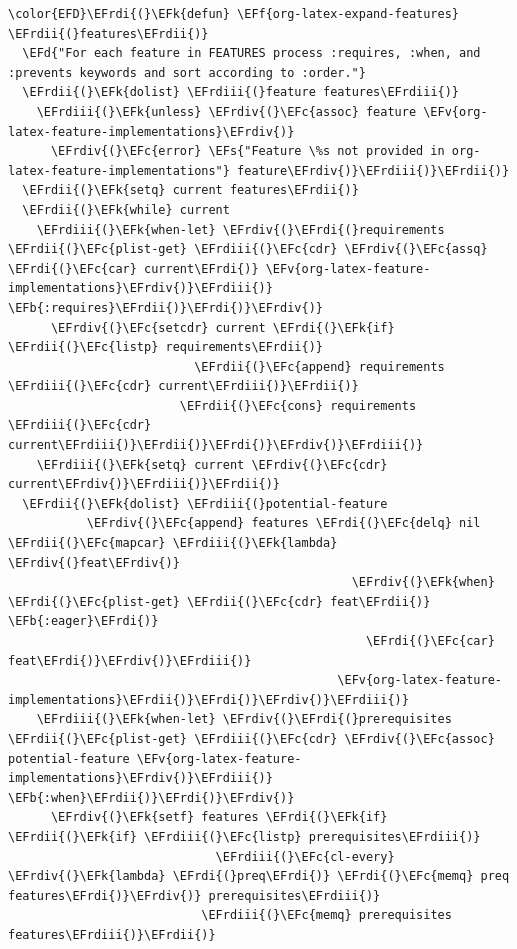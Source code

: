 \documentclass{scrartcl}
\newcommand{\EFk}[1]{\textcolor{EFk}{#1}} %
\newcommand{\EFd}[1]{\textcolor{EFd}{#1}} %
\newcommand{\EFs}[1]{\textcolor{EFs}{#1}} %
\newcommand{\EFb}[1]{\textcolor{EFb}{#1}} %
\newcommand{\EFc}[1]{\textcolor{EFc}{#1}} %
\newcommand{\EFv}[1]{\textcolor{EFv}{#1}} %
\newcommand{\EFf}[1]{\textcolor{EFf}{#1}} %
\newcommand{\EFrdi}[1]{#1} %
\newcommand{\EFrdii}[1]{#1} %
\newcommand{\EFrdiii}[1]{#1} %
\newcommand{\EFrdiv}[1]{#1} %
\begin{document}
\begin{Code}
\begin{Verbatim}[]
\color{EFD}\EFrdi{(}\EFk{defun} \EFf{org-latex-expand-features} \EFrdii{(}features\EFrdii{)}
  \EFd{"For each feature in FEATURES process :requires, :when, and :prevents keywords and sort according to :order."}
  \EFrdii{(}\EFk{dolist} \EFrdiii{(}feature features\EFrdiii{)}
    \EFrdiii{(}\EFk{unless} \EFrdiv{(}\EFc{assoc} feature \EFv{org-latex-feature-implementations}\EFrdiv{)}
      \EFrdiv{(}\EFc{error} \EFs{"Feature \%s not provided in org-latex-feature-implementations"} feature\EFrdiv{)}\EFrdiii{)}\EFrdii{)}
  \EFrdii{(}\EFk{setq} current features\EFrdii{)}
  \EFrdii{(}\EFk{while} current
    \EFrdiii{(}\EFk{when-let} \EFrdiv{(}\EFrdi{(}requirements \EFrdii{(}\EFc{plist-get} \EFrdiii{(}\EFc{cdr} \EFrdiv{(}\EFc{assq} \EFrdi{(}\EFc{car} current\EFrdi{)} \EFv{org-latex-feature-implementations}\EFrdiv{)}\EFrdiii{)} \EFb{:requires}\EFrdii{)}\EFrdi{)}\EFrdiv{)}
      \EFrdiv{(}\EFc{setcdr} current \EFrdi{(}\EFk{if} \EFrdii{(}\EFc{listp} requirements\EFrdii{)}
                          \EFrdii{(}\EFc{append} requirements \EFrdiii{(}\EFc{cdr} current\EFrdiii{)}\EFrdii{)}
                        \EFrdii{(}\EFc{cons} requirements \EFrdiii{(}\EFc{cdr} current\EFrdiii{)}\EFrdii{)}\EFrdi{)}\EFrdiv{)}\EFrdiii{)}
    \EFrdiii{(}\EFk{setq} current \EFrdiv{(}\EFc{cdr} current\EFrdiv{)}\EFrdiii{)}\EFrdii{)}
  \EFrdii{(}\EFk{dolist} \EFrdiii{(}potential-feature
           \EFrdiv{(}\EFc{append} features \EFrdi{(}\EFc{delq} nil \EFrdii{(}\EFc{mapcar} \EFrdiii{(}\EFk{lambda} \EFrdiv{(}feat\EFrdiv{)}
                                                \EFrdiv{(}\EFk{when} \EFrdi{(}\EFc{plist-get} \EFrdii{(}\EFc{cdr} feat\EFrdii{)} \EFb{:eager}\EFrdi{)}
                                                  \EFrdi{(}\EFc{car} feat\EFrdi{)}\EFrdiv{)}\EFrdiii{)}
                                              \EFv{org-latex-feature-implementations}\EFrdii{)}\EFrdi{)}\EFrdiv{)}\EFrdiii{)}
    \EFrdiii{(}\EFk{when-let} \EFrdiv{(}\EFrdi{(}prerequisites \EFrdii{(}\EFc{plist-get} \EFrdiii{(}\EFc{cdr} \EFrdiv{(}\EFc{assoc} potential-feature \EFv{org-latex-feature-implementations}\EFrdiv{)}\EFrdiii{)} \EFb{:when}\EFrdii{)}\EFrdi{)}\EFrdiv{)}
      \EFrdiv{(}\EFk{setf} features \EFrdi{(}\EFk{if} \EFrdii{(}\EFk{if} \EFrdiii{(}\EFc{listp} prerequisites\EFrdiii{)}
                             \EFrdiii{(}\EFc{cl-every} \EFrdiv{(}\EFk{lambda} \EFrdi{(}preq\EFrdi{)} \EFrdi{(}\EFc{memq} preq features\EFrdi{)}\EFrdiv{)} prerequisites\EFrdiii{)}
                           \EFrdiii{(}\EFc{memq} prerequisites features\EFrdiii{)}\EFrdii{)}

\end{Verbatim}
\end{Code}
\end{document}
